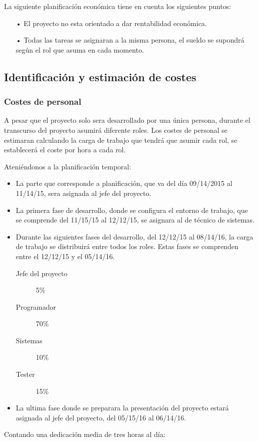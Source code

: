 
La siguiente planificación económica tiene en cuenta los siguientes puntos:
\begin{itemize}
\item[•]El proyecto no esta orientado a dar rentabilidad económica.
\item[•]Todas las tareas se asignaran a la misma persona, el sueldo se supondrá según el rol que asuma en cada momento. 
\end{itemize}

\subsection{Identificación y estimación de costes}
\subsubsection{Costes de personal}
A pesar que el proyecto solo sera desarrollado por una única persona, durante el transcurso del proyecto asumirá diferente roles. Los costes de personal se estimaran calculando la carga de trabajo que tendrá que asumir cada rol, se establecerá el coste por hora a cada rol.

Ateniéndonos a la planificación temporal:
\begin{itemize}
\item La parte que corresponde a planificación, que va del día 09/14/2015 al 11/14/15, sera asignada al jefe del proyecto.
\item La primera fase de desarrollo, donde se configura el entorno de trabajo, que se comprende del 11/15/15 al 12/12/15, se asignara al de técnico de sistemas.
\newpage
\item Durante las siguientes fases del desarrollo, del 12/12/15 al 08/14/16, la carga de trabajo se distribuirá entre todos los roles. Estas fases se comprenden entre el 12/12/15 y el 05/14/16.
\begin{description}
\item[Jefe del proyecto] 5\%
\item[Programador] 70\%
\item[Sistemas] 10\%
\item[Tester] 15\%
\end{description}
\item La ultima fase donde se preparara la presentación del proyecto estará asignada al jefe del proyecto, del 05/15/16 al 06/14/16.
\end{itemize}
Contando una dedicación media de tres horas al día:


